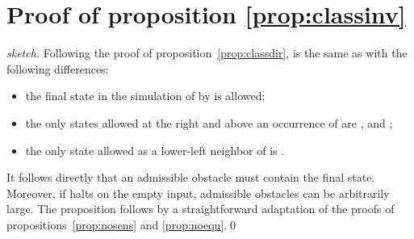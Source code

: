 \documentclass{llncs}
\begin{document}
\section{Proof of proposition \ref{prop:classinv}}


\begin{proof}[sketch]
  Following the proof of proposition~\ref{prop:classdir},
   is the same as
   with the following differences:
  \begin{itemize}
  \item the final state  in the simulation of  by
     is allowed;
  \item the only states allowed at the right and above an occurrence of
     are ,  and ;
  \item the only state allowed as a lower-left neighbor of  is .
  \end{itemize}
  It follows directly that an admissible obstacle must contain the
  final state. Moreover, if  halts on the empty input,
  admissible obstacles can be arbitrarily large. The proposition
  follows by a straightforward adaptation of the proofs of
  propositions~\ref{prop:nosens} and \ref{prop:noequ}.\qed
\end{proof}
\end{document}
